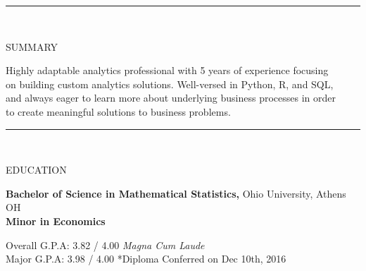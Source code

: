 \documentclass[12pt]{article}
\newcommand{\tab}[1][1cm]{\hspace*{#1}}
\newcommand{\header}[1]{
    \vspace*{-2mm}
    \rule{6.5in}{3pt} \\
    \smallskip
    \begin{large}
	    \textsc{\textcolor{lblue}{#1}}
    \end{large}
    \bigskip
}
\begin{document}
  \pagestyle{empty} %

  \begin{flushleft}
    \header{SUMMARY}

    \tab Highly adaptable analytics professional with 5 years of experience focusing \\
    \tab on building custom analytics solutions. Well-versed in Python, R, and SQL, \\
    \tab and always eager to learn more about underlying business processes in order \\
    \tab to create meaningful solutions to business problems. \\

    \smallskip
  \end{flushleft}
  
  \begin{flushleft}
    \header{EDUCATION}

    \textbf{Bachelor of Science in Mathematical Statistics,} \hfill Ohio University, Athens OH \\
    \textbf{Minor in Economics}

    \tab[0.5cm] Overall G.P.A:  3.82 / 4.00 \tab[0.25cm] \textit{Magna Cum Laude} \\
    \tab[0.5cm] \hspace*{2.08mm}Major G.P.A: 3.98 / 4.00  \hfill \small{*Diploma Conferred on Dec 10th, 2016}

    \smallskip
  \end{flushleft}
\end{document}
